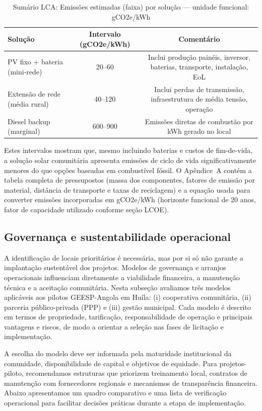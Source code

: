 \documentclass[12pt, a4paper]{article}
\begin{document}
\begin{table}[ht]
\centering
\caption{Sumário LCA: Emissões estimadas (faixa) por solução — unidade funcional: gCO2e/kWh}
\label{tab:lca_summary}
\begin{tabular}{lcc}
\toprule
\textbf{Solução} & \textbf{Intervalo (gCO2e/kWh)} & \textbf{Comentário} \\
\midrule
PV fixo + bateria (mini‑rede) & 20--60 & Inclui produção painéis, inversor, baterias, transporte, instalação, EoL \\
Extensão de rede (média rural) & 40--120 & Inclui perdas de transmissão, infraestrutura de média tensão, operação \\
Diesel backup (marginal) & 600--900 & Emissões diretas de combustão por kWh gerado no local \\
\bottomrule
\end{tabular}
\end{table}

Estes intervalos mostram que, mesmo incluindo baterias e custos de fim-de-vida, a solução
solar comunitária apresenta emissões de ciclo de vida significativamente menores do que
opções baseadas em combustível fóssil. O Apêndice~A contém a tabela completa de pressupostos
(massa dos componentes, fatores de emissão por material, distância de transporte e taxas de
reciclagem) e a equação usada para converter emissões incorporadas em gCO2e/kWh (horizonte
funcional de 20 anos, fator de capacidade utilizado conforme seção LCOE).


\subsection{Governança e sustentabilidade operacional}

A identificação de locais prioritários é necessária, mas por si só não garante a
implantação sustentável dos projetos. Modelos de governança e arranjos operacionais
influenciam diretamente a viabilidade financeira, a manutenção técnica e a aceitação
comunitária. Nesta subseção avaliamos três modelos aplicáveis aos pilotos GEESP-Angola
em Huíla: (i) cooperativa comunitária, (ii) parceria público-privada (PPP) e (iii)
gestão municipal. Cada modelo é descrito em termos de propriedade, tarificação,
responsabilidade de operação e principais vantagens e riscos, de modo a orientar a
seleção nas fases de licitação e implementação.

A escolha do modelo deve ser informada pela maturidade institucional da comunidade,
disponibilidade de capital e objetivos de equidade. Para projetos-piloto, recomendamos
estruturas que priorizem treinamento local, contratos de manutenção com fornecedores
regionais e mecanismos de transparência financeira. Abaixo apresentamos um quadro
comparativo e uma lista de verificação operacional para facilitar decisões práticas
durante a etapa de implementação.
\end{document}
